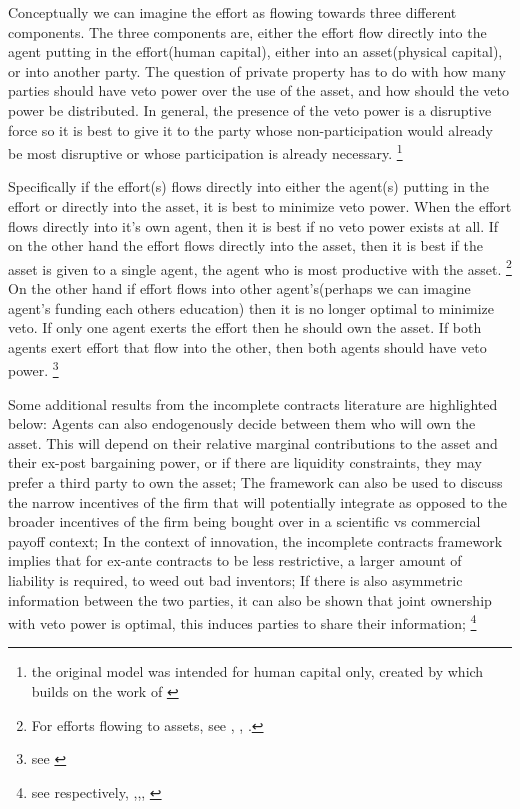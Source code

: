 \documentclass[12pt]{article}
\numberwithin{equation}{section}
\begin{document}
Conceptually we can imagine the effort as flowing towards three different components. The three components are, either the effort flow directly into the agent putting in the effort(human capital), either into an asset(physical capital), or into another party. The question of private property has to do with how many parties should have veto power over the use of the asset, and how should the veto power be distributed. In general, the presence of the veto power is a disruptive force so it is best to give it to the party whose non-participation would already be most disruptive or whose participation is already necessary. \footnote{the original model was intended for human capital only, created by \cite{Hart1990} which builds on the work of \cite{Grossman1986} }

Specifically if the effort(s) flows directly into either the agent(s) putting in the effort or directly into the asset, it is best to minimize veto power. When the effort flows directly into it's own agent, then it is best if no veto power exists at all. If on the other hand the effort flows directly into the asset, then it is best if the asset is given to a single agent, the agent who is most productive with the asset. \footnote{For efforts flowing to assets, see \cite{schmitz2013investments}, \citet{gattai2016investment}, \cite{schmitz2017incomplete}. } On the other hand if effort flows into other agent's(perhaps we can imagine agent's funding each others education) then it is no longer optimal to minimize veto. If only one agent exerts the effort then he should own the asset. If both agents exert effort that flow into the other, then both agents should have veto power. \footnote{see \cite{hamada2011incentive}}

Some additional results from the incomplete contracts literature are highlighted below: Agents can also endogenously decide between them who will own the asset. This will depend on their relative marginal contributions to the asset and their ex-post bargaining power, or if there are liquidity constraints, they may prefer a third party to own the asset; The framework can also be used to discuss the narrow incentives of the firm that will potentially integrate as opposed to the broader incentives of the firm being bought over in a scientific vs commercial payoff context; In the context of innovation, the incomplete contracts framework implies that for ex-ante contracts to be less restrictive, a larger amount of liability is required, to weed out bad inventors; If there is also asymmetric information between the two parties, it can also be shown that joint ownership with veto power is optimal, this induces parties to share their information; \footnote{see respectively, \cite{Aghion1994},\citep{lerner2010contractibility},\citep{anton1994expropriation}, \citep{Rosenkranz1999}}
\end{document}
